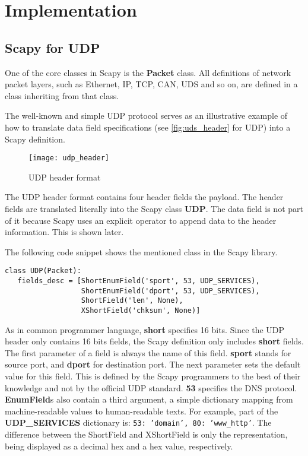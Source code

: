 \section{Implementation}

\subsection{Scapy for UDP}

One of the core classes in Scapy is the \textbf{Packet} class. All definitions of network packet layers, such as Ethernet, IP, TCP, CAN, UDS and so on, are defined in a class inheriting from that class.

The well-known and simple UDP protocol \cite{rfc768} serves as an illustrative example of how to translate data field specifications (see \autoref{fig:uds_header} for UDP) into a Scapy definition.

\begin{figure}[h]
    \centering
    \texttt{[image: udp\_header]}
    \caption{UDP header format \cite{udp_header}}
    \label{fig:uds_header}
\end{figure}

The UDP header format contains four header fields the payload. The header fields are translated literally into the Scapy class \textbf{UDP}. The data field is not part of it because Scapy uses an explicit operator to append data to the header information. This is shown later.

The following code snippet shows the mentioned class in the Scapy library.

\begin{samepage}
\begin{verbatim}
class UDP(Packet):
   fields_desc = [ShortEnumField('sport', 53, UDP_SERVICES),
                  ShortEnumField('dport', 53, UDP_SERVICES),
                  ShortField('len', None),
                  XShortField('chksum', None)]
\end{verbatim}
\end{samepage}

As in common programmer language, \textbf{short} specifies 16 bits. Since the UDP header only contains 16 bits fields, the Scapy definition only includes \textbf{short} fields. The first parameter of a field is always the name of this field. \textbf{sport} stands for source port, and \textbf{dport} for destination port.
The next parameter sets the default value for this field. This is defined by the Scapy programmers to the best of their knowledge and not by the official UDP standard. \textbf{53} specifies the DNS protocol.
\textbf{EnumField}s also contain a third argument, a simple dictionary mapping from machine-readable values to human-readable texts. For example, part of the \textbf{UDP\_SERVICES} dictionary is: \texttt{{53: 'domain', 80: 'www_http'}}.
The difference between the ShortField and XShortField is only the representation, being displayed as a decimal hex and a hex value, respectively.

